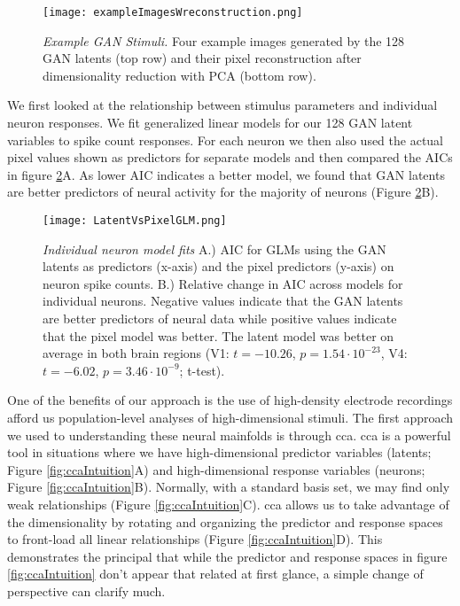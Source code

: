 \begin{figure}
	\centering
	\texttt{[image: exampleImagesWreconstruction.png]}
	{\caption{{\it Example GAN Stimuli.} Four example images generated by the 128 GAN latents (top row) and their pixel reconstruction after dimensionality reduction with PCA (bottom row).}
	\label{fig:exampleReconstructions}}
\end{figure}

We first looked at the relationship between stimulus parameters and individual neuron responses. We fit generalized linear models for our 128 GAN latent variables to spike count responses. For each neuron we then also used the actual pixel values shown as predictors for separate models and then compared the AICs in figure \ref{fig:modelAICs}A. As lower AIC indicates a better model, we found that GAN latents are better predictors of neural activity for the majority of neurons (Figure \ref{fig:modelAICs}B).

\begin{figure}
	\centering
	\texttt{[image: LatentVsPixelGLM.png]}
	{\caption{{\it Individual neuron model fits} A.) AIC for GLMs using the GAN latents as predictors (x-axis) and the pixel predictors (y-axis) on neuron spike counts. B.) Relative change in AIC across models for individual neurons. Negative values indicate that the GAN latents are better predictors of neural data while positive values indicate that the pixel model was better. The latent model was better on average in both brain regions (V1: $t=-10.26$, $p=1.54 \cdot 10^{-23}$, V4: $t=-6.02$, $p=3.46\cdot 10^{-9}$; t-test).}
	\label{fig:modelAICs}}
\end{figure}

One of the benefits of our approach is the use of high-density electrode recordings afford us population-level analyses of high-dimensional stimuli. The first approach we used to understanding these neural mainfolds is through \gls{cca}. \gls{cca} is a powerful tool in situations where we have high-dimensional predictor variables (latents; Figure \ref{fig:ccaIntuition}A) and high-dimensional response variables (neurons; Figure \ref{fig:ccaIntuition}B). Normally, with a standard basis set, we may find only weak relationships (Figure \ref{fig:ccaIntuition}C). \gls{cca} allows us to take advantage of the dimensionality by rotating and organizing the predictor and response spaces to front-load all linear relationships (Figure \ref{fig:ccaIntuition}D). This demonstrates the principal that while the predictor and response spaces in figure \ref{fig:ccaIntuition} don't appear that related at first glance, a simple change of perspective can clarify much.

